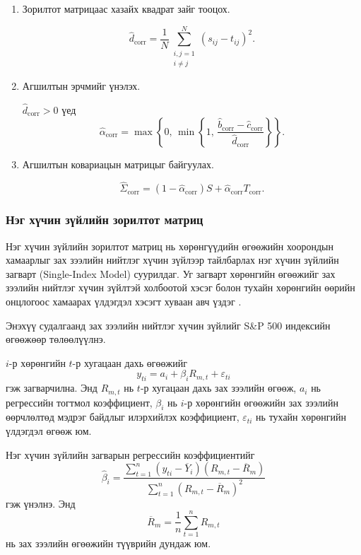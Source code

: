 \begin{enumerate}
	\item Зорилтот матрицаас хазайх
	квадрат зайг тооцох.
	
	\[
	\widehat d_{\mathrm{corr}}
	=
	\frac{1}{N}
	\sum_{\substack{i,j=1\\i\neq j}}^{N}
	(s_{ij}-t_{ij})^2.
	\]
	
	\item Агшилтын эрчмийг үнэлэх.
	
	$\widehat d_{\mathrm{corr}}>0$
	үед
	\[
	\widehat{\alpha}_{\mathrm{corr}}
	=
	\max\left\{
	0,\,
	\min\left\{
	1,\,
	\frac{
		\widehat b_{\mathrm{corr}}
		-
		\widehat c_{\mathrm{corr}}
	}{
		\widehat d_{\mathrm{corr}}
	}
	\right\}
	\right\}.
	\]
	
	\item Агшилтын ковариацын
	матрицыг байгуулах.
	
	\[
	\widehat{\Sigma}_{\mathrm{corr}}
	=
	(1-\widehat{\alpha}_{\mathrm{corr}})S
	+
	\widehat{\alpha}_{\mathrm{corr}}
	T_{\mathrm{corr}}.
	\]
\end{enumerate}

\subsubsection{Нэг хүчин зүйлийн зорилтот матриц}

Нэг хүчин зүйлийн зорилтот матриц нь хөрөнгүүдийн өгөөжийн
хоорондын хамаарлыг зах зээлийн нийтлэг хүчин зүйлээр
тайлбарлах нэг хүчин зүйлийн загварт (Single-Index Model)
суурилдаг. Уг загварт хөрөнгийн өгөөжийг зах зээлийн
нийтлэг хүчин зүйлтэй холбоотой хэсэг болон тухайн
хөрөнгийн өөрийн онцлогоос хамаарах үлдэгдэл хэсэгт
хуваан авч үздэг \citep{ledoitwolf2003}.

Энэхүү судалгаанд зах зээлийн нийтлэг хүчин зүйлийг
S\&P 500 индексийн өгөөжөөр төлөөлүүлнэ.

$i$-р хөрөнгийн $t$-р хугацаан дахь өгөөжийг
\[
y_{ti}
=
a_i+\beta_i R_{m,t}+\varepsilon_{ti}
\]
гэж загварчилна. Энд $R_{m,t}$ нь $t$-р хугацаан дахь
зах зээлийн өгөөж, $a_i$ нь регрессийн тогтмол
коэффициент, $\beta_i$ нь $i$-р хөрөнгийн өгөөжийн
зах зээлийн өөрчлөлтөд мэдрэг байдлыг илэрхийлэх
коэффициент, $\varepsilon_{ti}$ нь тухайн хөрөнгийн
үлдэгдэл өгөөж юм.

Нэг хүчин зүйлийн загварын регрессийн коэффициентийг
\[
\widehat{\beta}_i
=
\frac{
	\sum_{t=1}^{n}
	(y_{ti}-\overline{Y}_i)
	(R_{m,t}-\overline{R}_m)
}{
	\sum_{t=1}^{n}
	(R_{m,t}-\overline{R}_m)^2
}
\]
гэж үнэлнэ. Энд
\[
\overline{R}_m
=
\frac{1}{n}
\sum_{t=1}^{n}R_{m,t}
\]
нь зах зээлийн өгөөжийн түүврийн дундаж юм.

